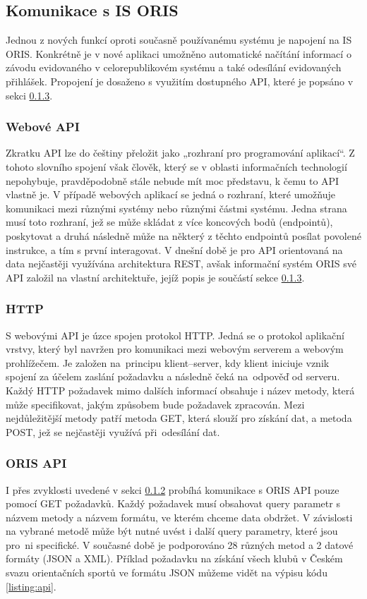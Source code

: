 \subsection{Komunikace s IS ORIS}
Jednou z nových funkcí oproti současně používanému systému je napojení na IS ORIS. Konkrétně je v nové aplikaci umožněno automatické načítání informací o závodu evidovaného v celorepublikovém systému a také odesílání evidovaných přihlášek. Propojení je dosaženo s využitím dostupného API, které je popsáno v sekci \ref{implementation:oris-api}.

\subsubsection{Webové API}\label{implementation:api}
Zkratku API lze do češtiny přeložit jako „rozhraní pro programování aplikací“. Z tohoto slovního spojení však člověk, který se v oblasti informačních technologií nepohybuje, pravděpodobně stále nebude mít moc představu, k čemu to API vlastně je. V případě webových aplikací se jedná o rozhraní, které umožňuje komunikaci mezi různými systémy nebo různými částmi systému. Jedna strana musí toto rozhraní, jež se může skládat z více koncových bodů (endpointů), poskytovat a druhá následně může na některý z těchto endpointů posílat povolené instrukce, a tím s první interagovat. V dnešní době je pro API orientovaná na data nejčastěji využívána architektura REST, avšak informační systém ORIS své API založil na vlastní architektuře, jejíž popis je součástí sekce \ref{implementation:oris-api}. \cite{api}

\subsubsection{HTTP}\label{http}
S webovými API je úzce spojen protokol HTTP. Jedná se o protokol aplikační vrstvy, který byl navržen pro komunikaci mezi webovým serverem a webovým prohlížečem. Je založen na~principu klient--server, kdy klient iniciuje vznik spojení za účelem zaslání požadavku a následně čeká na~odpověď od serveru. Každý HTTP požadavek mimo dalších informací obsahuje i název metody, která může specifikovat, jakým způsobem bude požadavek zpracován. Mezi nejdůležitější metody patří metoda GET, která slouží pro získání dat, a metoda POST, jež se nejčastěji využívá při~odesílání dat. \cite{http}

\subsubsection{ORIS API}\label{implementation:oris-api}
I přes zvyklosti uvedené v sekci \ref{http} probíhá komunikace s ORIS API pouze pomocí GET požadavků. Každý požadavek musí obsahovat query parametr s názvem metody a názvem formátu, ve kterém chceme data obdržet. V závislosti na vybrané metodě může být nutné uvést i další query parametry, které jsou pro~ni specifické. V současné době je podporováno 28 různých metod a 2 datové formáty (JSON a XML). Příklad požadavku na získání všech klubů v Českém svazu orientačních sportů ve formátu JSON můžeme vidět na výpisu kódu \ref{listing:api}. 

